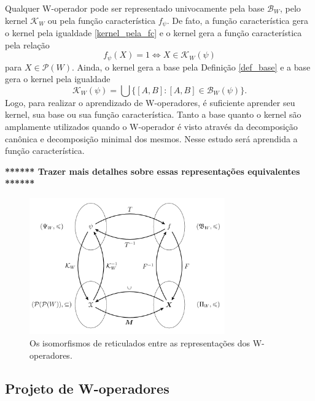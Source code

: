 Qualquer W-operador pode ser representado univocamente pela base $\mathcal{B}_{W}$, pelo kernel $\mathcal{K}_{W}$ ou pela função característica $f_{\psi}$. De fato, a função característica gera o kernel pela igualdade \eqref{kernel_pela_fc} e o kernel gera a função característica pela relação
\begin{equation*}
    f_{\psi}(X) = 1 \iff X \in \mathcal{K}_{W}(\psi)
\end{equation*}
para $X \in \mathcal{P}(W)$. Ainda, o kernel gera a base pela Definição \ref{def_base} e a base gera o kernel pela igualdade
\begin{equation*}
    \mathcal{K}_{W} \left( \psi \right) =  \bigcup \{[A,B]: [A,B] \in \mathcal{B}_{W} \left( \psi \right)\}.
\end{equation*}
Logo, para realizar o aprendizado de W-operadores, é suficiente aprender seu kernel, sua base ou sua função característica. Tanto a base quanto o kernel são amplamente utilizados quando o W-operador é visto através da decomposição canônica e decomposição minimal dos mesmos. Nesse estudo será aprendida a função característica.

\textbf{****** Trazer mais detalhes sobre essas representações equivalentes ******}

\begin{figure}
  \centering
  \includegraphics[width=0.75\textwidth]{figuras/lattice_isomorphism.png}
  \caption{Os isomorfismos de reticulados entre as representações dos W-operadores.\label{fig:isomorphism}}
\end{figure}

\subsection{Projeto de W-operadores}
\label{subsec:compwop}


